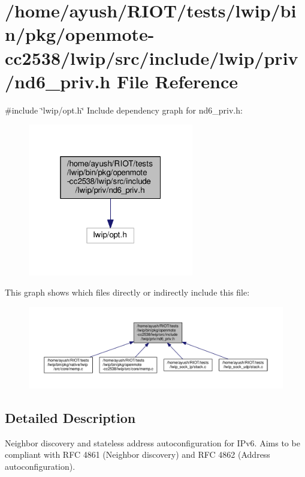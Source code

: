 \hypertarget{openmote-cc2538_2lwip_2src_2include_2lwip_2priv_2nd6__priv_8h}{}\section{/home/ayush/\+R\+I\+O\+T/tests/lwip/bin/pkg/openmote-\/cc2538/lwip/src/include/lwip/priv/nd6\+\_\+priv.h File Reference}
\label{openmote-cc2538_2lwip_2src_2include_2lwip_2priv_2nd6__priv_8h}
{\ttfamily \#include \char`\"{}lwip/opt.\+h\char`\"{}}\newline
Include dependency graph for nd6\+\_\+priv.\+h\+:
\nopagebreak
\begin{figure}[H]
\begin{center}
\leavevmode
\includegraphics[width=205pt]{openmote-cc2538_2lwip_2src_2include_2lwip_2priv_2nd6__priv_8h__incl}
\end{center}
\end{figure}
This graph shows which files directly or indirectly include this file\+:
\nopagebreak
\begin{figure}[H]
\begin{center}
\leavevmode
\includegraphics[width=350pt]{openmote-cc2538_2lwip_2src_2include_2lwip_2priv_2nd6__priv_8h__dep__incl}
\end{center}
\end{figure}


\subsection{Detailed Description}
Neighbor discovery and stateless address autoconfiguration for I\+Pv6. Aims to be compliant with R\+FC 4861 (Neighbor discovery) and R\+FC 4862 (Address autoconfiguration). 